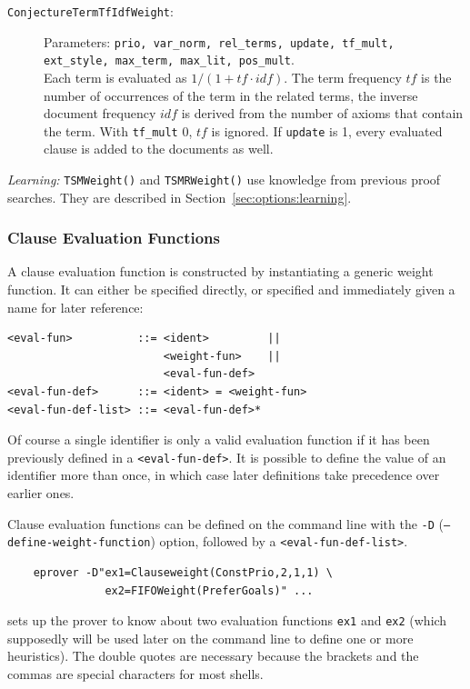 \documentclass{report}
\begin{document}
\begin{description}
\item[\texttt{ConjectureTermTfIdfWeight}:] Parameters: \texttt{prio,
    var\_norm, rel\_terms, update, tf\_mult, ext\_style, max\_term,
    max\_lit, pos\_mult}.\\
  Each term is evaluated as $1/(1+\mathit{tf}\cdot\mathit{idf})$. The
  term frequency $\mathit{tf}$ is the number of occurrences of the
  term in the related terms, the inverse document frequency
  $\mathit{idf}$ is derived from the number of axioms that contain
  the term. With \texttt{tf\_mult} 0, $\mathit{tf}$ is ignored. If
  \texttt{update} is 1, every
  evaluated clause is added to the documents as well.
\end{description}

\medskip
\noindent\emph{Learning:} \texttt{TSMWeight()} and
\texttt{TSMRWeight()} use knowledge from previous proof searches. They
are described in Section~\ref{sec:options:learning}.
\par\endgroup


\subsubsection{Clause Evaluation Functions}

A clause evaluation function is constructed by instantiating a generic
weight function. It can either be specified directly, or specified and
immediately given a name for later reference:

 \begin{verbatim}
<eval-fun>          ::= <ident>         ||
                        <weight-fun>    ||
                        <eval-fun-def>
<eval-fun-def>      ::= <ident> = <weight-fun>
<eval-fun-def-list> ::= <eval-fun-def>*
\end{verbatim}

Of course a single identifier is only a valid evaluation function if
it has been previously defined in a \texttt{<eval-fun-def>}. It is
possible to define the value of an identifier more than once, in which
case later definitions take precedence over earlier ones.

Clause evaluation functions can be defined on the command line with
the \texttt{-D} (\texttt{--define-weight-function}) option, followed
by a \texttt{<eval-fun-def-list>}.

\begin{example}
\begin{verbatim}
    eprover -D"ex1=Clauseweight(ConstPrio,2,1,1) \
               ex2=FIFOWeight(PreferGoals)" ...
\end{verbatim}
  sets up the prover to know about two evaluation functions
  \texttt{ex1} and \texttt{ex2} (which supposedly will be used later on
  the command line to define one or more heuristics). The double
  quotes are necessary because the brackets and the commas are
  special characters for most shells.
\end{example}
\end{document}
